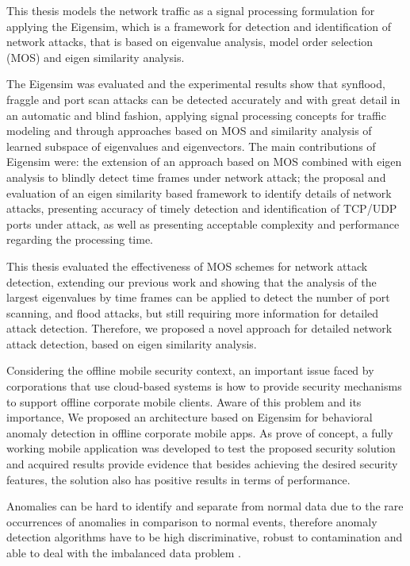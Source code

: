 This thesis models the network traffic as a signal processing formulation for applying the Eigensim, which is a framework for detection and identification of network attacks, that is based on eigenvalue analysis, model order selection (MOS) and eigen similarity analysis.

The Eigensim was evaluated and the experimental results show that synflood, fraggle and port scan attacks can be detected accurately and with great detail in an automatic and blind fashion, applying signal processing concepts for traffic modeling and through approaches based on MOS and similarity analysis of learned subspace of eigenvalues and eigenvectors. The main contributions of Eigensim were: the extension of an approach based on MOS combined with eigen analysis to blindly detect time frames under network attack; the proposal and evaluation of an eigen similarity based framework to identify details of network attacks, presenting accuracy of timely detection and identification of TCP/UDP ports under attack, as well as presenting acceptable complexity and performance regarding the processing time.

This thesis evaluated the effectiveness of MOS schemes for network attack detection, extending our previous work \cite{tenorio2013greatest} and showing that the analysis of the largest eigenvalues by time frames can be applied to detect the number of port scanning, and flood attacks, but still requiring more information for detailed attack detection. Therefore, we proposed a novel approach for detailed network attack detection, based on eigen similarity analysis.

Considering the offline mobile security context, an important issue faced by corporations that use cloud-based systems is how to provide security mechanisms to support offline corporate mobile clients. Aware of this problem and its importance, We proposed an architecture based on Eigensim for behavioral anomaly detection in offline corporate mobile apps. As prove of concept, a fully working mobile application was developed to test the proposed security solution and acquired results provide evidence that besides achieving the desired security features, the solution also has positive results in terms of performance. 

Anomalies can be hard to identify and separate from normal data due to the rare occurrences of anomalies in comparison to normal events, therefore anomaly detection algorithms have to be high discriminative, robust to contamination and able to deal with the imbalanced data problem \cite{he2008learning}.

